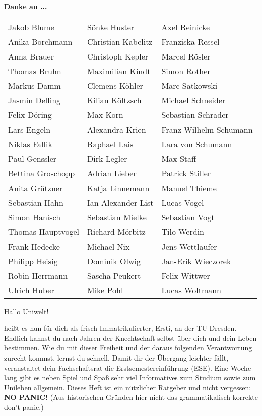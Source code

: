 \textbf{Danke an ...}
\\

\begin{tabular}{l l l} 

Jakob Blume & Sönke Huster & Axel Reinicke\\
Anika Borchmann & Christian Kabelitz & Franziska Ressel\\
Anna Brauer & Christoph Kepler & Marcel Rösler\\
Thomas Bruhn & Maximilian Kindt & Simon Rother\\
Markus Damm & Clemens Köhler & Marc Satkowski\\
Jasmin Delling & Kilian Költzsch & Michael Schneider\\
Felix Döring & Max Korn & Sebastian Schrader\\
Lars Engeln & Alexandra Krien & Franz-Wilhelm Schumann\\
Niklas Fallik & Raphael Lais & Lara von Schumann\\
Paul Genssler & Dirk Legler & Max Staff\\
Bettina Groschopp & Adrian Lieber & Patrick Stiller\\
Anita Grützner & Katja Linnemann & Manuel Thieme\\
Sebastian Hahn & Ian Alexander List & Lucas Vogel\\
Simon Hanisch & Sebastian Mielke &  Sebastian Vogt\\
Thomas Hauptvogel & Richard Mörbitz & Tilo Werdin\\
Frank Hedecke & Michael Nix & Jens Wettlaufer\\
Philipp Heisig & Dominik Olwig & Jan-Erik Wieczorek\\
Robin Herrmann & Sascha Peukert & Felix Wittwer\\
Ulrich Huber & Mike Pohl & Lucas Woltmann\\

\end{tabular}


Hallo Uniwelt!

heißt es nun für dich als frisch Immatrikulierter, Ersti, an der TU Dresden. 
Endlich kannst du nach Jahren der Knechtschaft selbst über dich und dein Leben bestimmen. 
Wie du mit dieser Freiheit und der daraus folgenden Verantwortung zurecht kommst, lernst du schnell. 
Damit dir der Übergang leichter fällt, veranstaltet dein Fachschaftsrat die Erstsemestereinführung (ESE). 
Eine Woche lang gibt es neben Spiel und Spaß sehr viel Informatives zum Studium sowie zum Unileben allgemein. 
Dieses Heft ist ein nützlicher Ratgeber und nicht vergessen: 
\textbf{NO PANIC!} (Aus historischen Gründen hier nicht das grammatikalisch korrekte \glqq don't panic\grqq.)


